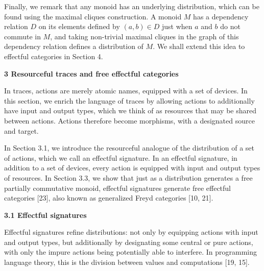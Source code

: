  
 
Finally, we remark that any monoid has an underlying distribution, which can be found using the maximal cliques construction. A monoid $M$ has a dependency relation $D$ on its elements defined by $(a,b)\in D$ just when $a$ and $b$ do not commute in $M$, and taking non-trivial maximal cliques in the graph of this dependency relation defines a distribution of $M$. We shall extend this idea to effectful categories in Section 4.\par
 
 


 
\par\medskip\noindent\textbf{3 Resourceful traces and free effectful categories}\par
 
 
In traces, actions are merely atomic names, equipped with a set of devices. In this section, we enrich the language of traces by allowing actions to additionally have input and output types, which we think of as resources that may be shared between actions. Actions therefore become morphisms, with a designated source and target.\par
 
 
 
In Section 3.1, we introduce the resourceful analogue of the distribution of a set of actions, which we call an effectful signature. In an effectful signature, in addition to a set of devices, every action is equipped with input and output types of resources. In Section 3.3, we show that just as a distribution generates a free partially commutative monoid, effectful signatures generate free effectful categories [23], also known as generalized Freyd categories [10, 21].\par
 
 
 
\par\medskip\noindent\textbf{3.1 Effectful signatures}\par
 
 
Effectful signatures refine distributions: not only by equipping actions with input and output types, but additionally by designating some central or pure actions, with only the impure actions being potentially able to interfere. In programming language theory, this is the division between values and computations [19, 15].\par
 
